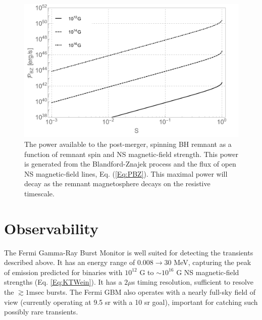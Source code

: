 \begin{figure}
\begin{center}
\includegraphics[scale=0.33]{figures/ch7/PostMergerLum_BZ.pdf} \vspace{-20 pt}
\end{center}
\caption{The power available to the post-merger, spinning BH remnant
  as a function of remnant spin and NS magnetic-field strength. This
  power is generated from the Blandford-Znajek process and the flux of
  open NS magnetic-field lines, Eq. (\ref{Eq:PBZ}). This maximal power
  will decay as the remnant magnetosphere decays on the resistive
  timescale.}
\label{Fig:PostMerger}
\end{figure}



\section{Observability}
\label{Observability}
The Fermi Gamma-Ray Burst Monitor \citep[GBM][]{FERMIGBM:2015} is well suited for detecting
the transients described above. It has an energy range of $0.008
\rightarrow 30$ MeV, capturing the peak of emission predicted for
binaries with $10^{12}$ G to $\sim 10^{16}$ G NS magnetic-field
strengths (Eq. \ref{Eq:KTWein}). It has a $2 \mu$s timing resolution,
sufficient to resolve the $\gtrsim 1$msec bursts. The Fermi GBM also
operates with a nearly full-sky field of view (currently operating at
9.5 sr with a 10 sr goal), important for catching such possibly rare
transients.

